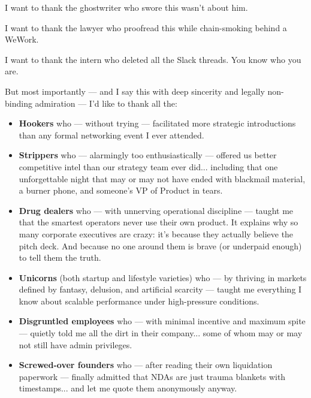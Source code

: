 \documentclass{article}
\begin{document}
  I want to thank the ghostwriter who swore this wasn't about him.  

  I want to thank the lawyer who proofread this while chain-smoking behind a WeWork.  

  I want to thank the intern who deleted all the Slack threads. You know who you are.

  But most importantly — and I say this with deep sincerity and legally non-binding admiration —  
  I’d like to thank all the:
  
  \begin{itemize}
    \item \textbf{Hookers} who --- without trying --- facilitated more strategic introductions  
    than any formal networking event I ever attended.  
    
    \item \textbf{Strippers} who --- alarmingly too enthusiastically --- offered us better competitive intel 
    than our strategy team ever did... 
    including that one unforgettable night that may or may not have ended with blackmail material, a burner phone, 
    and someone's VP of Product in tears.
    
    \item \textbf{Drug dealers} who --- with unnerving operational discipline --- taught me 
    that the smartest operators never use their own product.  
    It explains why so many corporate executives are crazy: it's because 
    they actually believe the pitch deck.  
    And because no one around them is brave (or underpaid enough) to tell them the truth.
    
    \item \textbf{Unicorns} (both startup and lifestyle varieties) who --- by thriving in markets  
    defined by fantasy, delusion, and artificial scarcity --- taught me everything I know 
    about scalable performance under high-pressure conditions.
    
    \item \textbf{Disgruntled employees} who --- with minimal incentive and maximum spite --- 
    quietly told me all the dirt in their company... some of whom may or 
    may not still have admin privileges.
    
    \item \textbf{Screwed-over founders} who --- after reading their own liquidation paperwork --- 
    finally admitted that NDAs are just trauma blankets with 
    timestamps... and let me quote them anonymously anyway.


\end{itemize}
\end{document}

